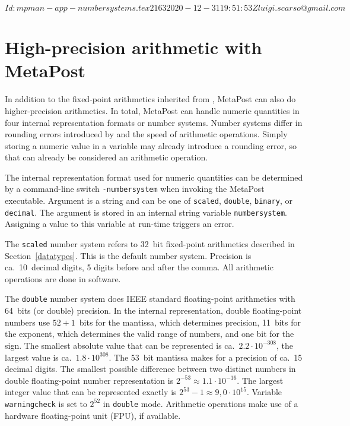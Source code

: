 \svnInfo $Id: mpman-app-numbersystems.tex 2163 2020-12-31 19:51:53Z luigi.scarso@gmail.com $
\section{High-precision arithmetic with MetaPost}
\label{hparith}

In addition to the fixed-point arithmetics inherited from \MF, MetaPost
can also do higher-precision arithmetics.  In total, MetaPost can handle
numeric quantities in four internal representation formats or number
systems.  Number systems differ in rounding errors
introduced by and the speed of arithmetic operations.  Simply storing a
numeric value in a variable may already introduce a rounding error, so
that can already be considered an arithmetic operation.

The internal representation format used for numeric quantities can be
determined by a command-line switch
\texttt{-numbersystem}
when invoking the MetaPost executable.  Argument is a string and can be
one of \texttt{scaled}, \texttt{double}, \texttt{binary}, or
\texttt{decimal}.  The argument is stored in an internal string variable
\texttt{numbersystem}\label{Dnumbersystem}.
Assigning a value to this variable at run-time triggers an error.

The \texttt{scaled} number system refers
to 32~bit fixed-point arithmetics described in Section~\ref{datatypes}.
This is the default number system.  Precision is ca.~10~decimal digits,
5 digits before and after the comma.  All arithmetic operations are done
in software.

The \texttt{double} number system does
IEEE standard floating-point arithmetics with 64~bits (or double)
precision.  In the internal representation, double floating-point
numbers use $52+1$~bits for the mantissa, which determines precision,
11~bits for the exponent, which determines the valid range of numbers,
and one bit for the sign.  The smallest absolute value that can be
represented is ca.~$2.2\cdot10^{-308}$, the largest value is
ca.~$1.8\cdot10^{308}$.  The 53~bit mantissa makes for a precision of
ca.~15 decimal digits.  The smallest possible difference between two
distinct numbers in double floating-point number representation is
$2^{-53} \approx 1.1\cdot10^{-16}$.  The largest integer value that can
be represented exactly is $2^{53}-1 \approx 9,0\cdot10^{15}$.  Variable
\texttt{warningcheck} is set
to $2^{52}$ in \texttt{double} mode.  Arithmetic operations make use of
a hardware floating-point unit (FPU), if available.

